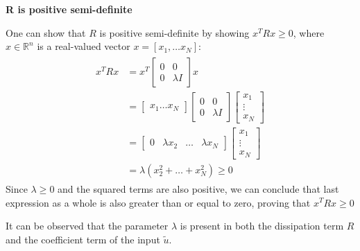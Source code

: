 \hrulefill

\textbf{R is positive semi-definite}

 One can show that $R$ is positive semi-definite by showing $x^TRx \geq 0$, where $x \in \mathbb R^n$ is a real-valued vector $ x = [x_1,\dots x_N]$:
 \begin{gather*}
    \begin{aligned}
    x^TRx&=x^T\begin{bmatrix}
        0 & 0 \\
        0 & \lambda I
    \end{bmatrix}x
    \\
    &=\begin{bmatrix}
        x_1\dots x_N
    \end{bmatrix}
    \begin{bmatrix}
        0 & 0 \\
        0 & \lambda I
    \end{bmatrix}
    \begin{bmatrix}
        x_1 \\ \vdots \\ x_N
    \end{bmatrix}
    \\
    &=\begin{bmatrix}
        0 & \lambda x_2 & \dots & \lambda x_N
    \end{bmatrix}
    \begin{bmatrix}
        x_1 \\ \vdots \\ x_N
    \end{bmatrix}
    \\
    &=\lambda(x_2^2+\dots+x_N^2) \geq 0
    \end{aligned}
 \end{gather*}
 Since $\lambda \geq 0$ and the squared terms are also positive, we can conclude that last expression as a whole is also greater than or equal to zero, proving that $x^TRx \geq 0$

 It can be observed that the parameter $\lambda$ is present in both the dissipation term $R$ and the coefficient term of the input $\tilde u$.
 
